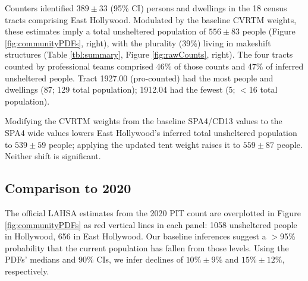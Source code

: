 \documentclass[11pt,twocolumn]{article}
\def\resp{respectively}
\def\dh{10\%\pm9\%}
\def\nce{389}
\def\ne{556\pm83}
\def\de{15\%\pm12\%}
\begin{document}
Counters identified $\nce\pm33$ (95\% CI) persons and dwellings in the 18 census tracts 
comprising East Hollywood. Modulated by the baseline CVRTM weights, these estimates imply 
a total unsheltered population of $\ne$ people (Figure \ref{fig:communityPDFs},
right), with the plurality (39\%) living in makeshift structures (Table \ref{tbl:summary}, 
Figure \ref{fig:rawCounts}, right). The four tracts counted by professional teams comprised 46\% of 
those counts and 47\% of inferred unsheltered people. Tract 1927.00 (pro-counted) had the 
most people and dwellings (87; 129 total population); 1912.04 had the fewest 
(5; $<$16 total population). 

Modifying the CVRTM weights from the baseline SPA4/CD13 values to the SPA4 wide values 
lowers East Hollywood's inferred total unsheltered population to $539\pm59$ people; applying
the updated tent weight raises it to $559\pm87$ people. Neither shift is significant.




\subsection{Comparison to 2020}
\label{sec:comp}

The official LAHSA estimates from the 2020 PIT count are overplotted in Figure \ref{fig:communityPDFs} 
as red vertical lines in each panel: 1058 unsheltered people in Hollywood, 656 in East Hollywood.
Our baseline inferences suggest a $>$95\% probability that the current population has fallen from 
those levels. Using the PDFs' medians and 90\% CIs, we infer declines of $\dh$ and 
$\de$, \resp. 
\end{document}
